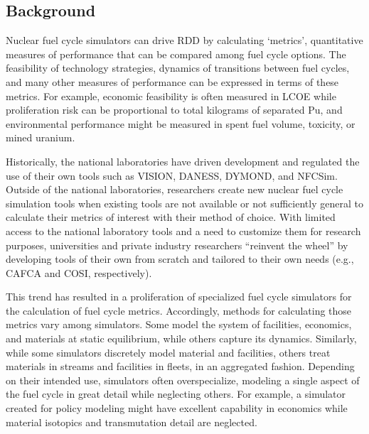 \subsection{Background}



Nuclear fuel cycle simulators can drive \gls{RDD} by calculating `metrics', 
quantitative measures of performance that 
can be compared among fuel cycle options. The feasibility of technology 
strategies, dynamics of transitions between fuel cycles, and many other 
measures of performance can be expressed in terms of these metrics. For example, 
economic feasibility is often measured in \gls{LCOE} while proliferation risk 
can be proportional to total kilograms of separated Pu, and environmental 
performance might be measured in spent fuel volume, toxicity, or mined uranium.

Historically, the national laboratories have driven development and regulated 
the use of their own tools such as \gls{VISION}\cite{jacobson_verifiable_2010}, 
\gls{DANESS}\cite{van_den_durpel_daness_2009}, 
\gls{DYMOND}\cite{yacout_modeling_2005}, and 
\gls{NFCSim}\cite{schneider_nfcsim:_2005}. 
Outside of the national laboratories, researchers create new nuclear fuel cycle 
simulation tools when existing tools are not available or not sufficiently 
general to calculate their metrics of interest with their method of choice.  
With limited access to the national laboratory tools and a need to customize 
them for research purposes, universities and private industry researchers 
``reinvent the wheel'' by developing tools of their own from scratch and 
tailored to their own needs (e.g., \gls{CAFCA}\cite{guerin_impact_2009} and 
\gls{COSI}\cite{boucher_cosi_2005,boucher_cosi:_2006,meyer_new_2009,coquelet-pascal_comparison_2011}, respectively). 

This trend has resulted in a proliferation of specialized
fuel cycle simulators for the calculation of fuel cycle metrics.  Accordingly, methods 
for calculating those metrics vary among simulators. Some model the 
system of facilities, economics, and materials at static equilibrium, while 
others capture its dynamics.  
Similarly, while some simulators discretely model material and facilities, 
others treat materials in streams and facilities in fleets, in an aggregated 
fashion. Depending on their intended use, simulators often overspecialize, 
modeling a single aspect of the fuel cycle in great detail while neglecting 
others. For example, a simulator created for policy modeling might have excellent 
capability in economics while material isotopics and transmutation detail are 
neglected.

